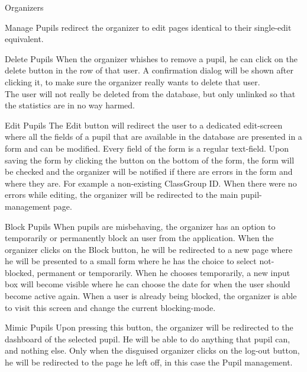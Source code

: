 \begin{section}{Organizers}
\begin{subsection}{Manage Pupils}
		redirect the organizer to edit pages identical to their single-edit equivalent.
		\begin{subsubsection}{Delete Pupils}
			When the organizer whishes to remove a pupil, he can click on the delete
			button in the row of that user. A confirmation dialog will be shown after
			clicking it, to make sure the organizer really wants to delete that user. \\
			The user will not really be deleted from the database, but only unlinked so
			that the statistics are in no way harmed.
		\end{subsubsection}
		\begin{subsubsection}{Edit Pupils}
			\label{sec:organizer_edit_pupils}
			The Edit button will redirect the user to a dedicated edit-screen where all
			the fields of a pupil that are available in the database are presented in a
			form and can be modified. Every field of the form is a regular text-field.
			Upon saving the form by clicking the button on the bottom of the form, the
			form will be checked and the organizer will be notified if there are errors
			in the form and where they are. For example a non-existing ClassGroup ID.
			When there were no errors while editing, the organizer will be redirected to
			the main pupil-management page.
		\end{subsubsection}
		\begin{subsubsection}{Block Pupils}
			\label{sec:organizer_block_pupils}
			When pupils are misbehaving, the organizer has an option to temporarily or
			permanently block an user from the application. When the organizer clicks on
			the Block button, he will be redirected to a new page where he will be presented
			to a small form where he has the choice to select not-blocked, permanent or
			temporarily. When he chooses temporarily, a new input box will become visible
			where he can choose the date for when the user should become active again.
			When a user is already being blocked,
			the organizer is able to visit this screen and change the current
			blocking-mode.
		\end{subsubsection}
		\begin{subsubsection}{Mimic Pupils}
			Upon pressing this button, the organizer will be redirected to the dashboard
			of the selected pupil. He will be able to do anything that pupil can, and
			nothing else. Only when the disguised organizer clicks on the log-out button,
			he will be redirected to the page he left off, in this case the Pupil
			management.
		\end{subsubsection}
		

\end{subsection}
\end{section}
